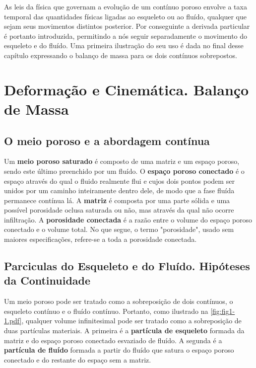 \documentclass[
	11pt, %
	fleqn, %
	a4paper, %
]{LegrandOrangeBook}
\begin{document}
As leis da física que governam a evolução de um contínuo poroso envolve a taxa temporal das quantidades físicas ligadas ao esqueleto ou ao fluído, qualquer que sejam seus movimentos distintos posterior. Por conseguinte a derivada particular é portanto introduzida, permitindo a nós seguir separadamente o movimento do esqueleto e do fluído. Uma primeira ilustração do seu uso é dada no final desse capítulo expressando o balanço de massa para os dois contínuos sobrepostos.

\section{Deformação e Cinemática. Balanço de Massa}


\subsection{O meio poroso e a abordagem contínua}

Um \textbf{meio poroso saturado} é composto de uma matriz e um espaço poroso, sendo este último preenchido por um fluído. O \textbf{espaço poroso conectado} é o espaço através do qual o fluido realmente flui e cujos dois pontos podem ser unidos por um caminho inteiramente dentro dele, de modo que a fase fluída permanece contínua lá. A \textbf{matriz} é composta por uma parte sólida e uma possível porosidade oclusa saturada ou não, mas através da qual não ocorre infiltração. A \textbf{porosidade conectada} é a razão entre o volume do espaço poroso conectado e o volume total. No que segue, o termo "porosidade", usado sem maiores especificações, refere-se a toda a porosidade conectada.

\subsection{Parciculas do Esqueleto e do Fluído. Hipóteses da Continuidade}

Um meio poroso pode ser tratado como a sobreposição de dois contínuos, o esqueleto contínuo e o fluído contínuo. Portanto, como ilustrado na \autoref{fig:fig1-1.pdf}, qualquer volume infinitesimal pode ser tratado como a sobreposição de duas partículas materiais. A primeira é a \textbf{partícula de esqueleto} formada da matriz e do espaço poroso conectado esvaziado de fluído. A segunda é a \textbf{partícula de fluído} formada a partir do fluído que satura o espaço poroso conectado e do restante do espaço sem a matriz.
\end{document}
